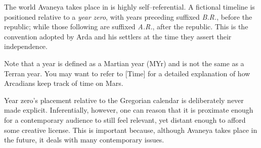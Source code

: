 
The world Avaneya takes place in is highly self--referential. A fictional timeline is positioned relative to a {\it year zero}, with years preceding suffixed {\it B.R.}, before the republic; while those following are suffixed {\it A.R.}, after the republic. This is the convention adopted by Arda and his settlers at the time they assert their independence.

Note that a year is defined as a Martian year (MYr) and is not the same as a Terran year. You may want to refer to [Time] for a detailed explanation of how Arcadians keep track of time on Mars.

Year zero's placement relative to the Gregorian calendar is deliberately never made explicit. Inferentially, however, one can reason that it is proximate enough for a contemporary audience to still feel relevant, yet distant enough to afford some creative license. This is important because, although Avaneya takes place in the future, it deals with many contemporary issues.

\startlines
\page 
\page 
\page 
\page 
\page 
\page 
\page 
\stoplines

\StopChapter

